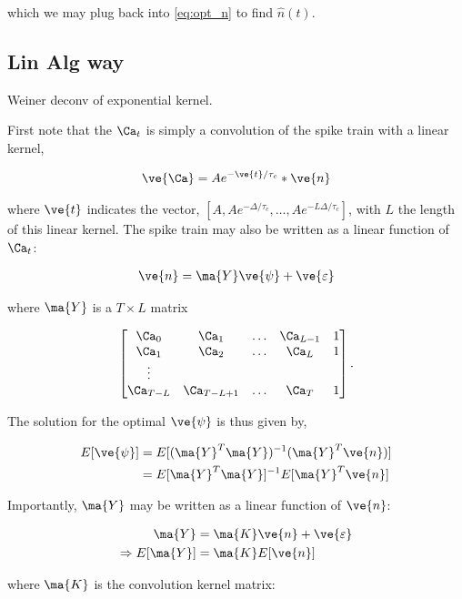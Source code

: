 \noindent which we may plug back into \eqref{eq:opt_n} to find $\widehat{n}(t)$.


\subsection{Lin Alg way}

Weiner deconv of exponential kernel.

First note that the $\Ca_t$ is simply a convolution of the spike train with a linear kernel,

\begin{align}
\ve{\Ca} = Ae^{-\ve{t}/\tau_c} \ast \ve{n}
\end{align}

\noindent where $\ve{t}$ indicates the vector, $[A, Ae^{-\Delta/\tau_c},\ldots, Ae^{-L\Delta/\tau_c}]$, with $L$ the length of this linear kernel.  The spike train may also be written as a linear function of $\Ca_t$:


\begin{align}
\ve{n} = \ma{Y} \ve{\psi} + \ve{\varepsilon}
\end{align}

\noindent where $\ma{Y}$ is a $T \times L$ matrix

\begin{equation}
\begin{bmatrix}
\Ca_0&\Ca_1&\ldots&\Ca_{L-1}&1\\
\Ca_1&\Ca_2&\ldots&\Ca_L&1\\
\vdots\\
\Ca_{T-L}&\Ca_{T-L+1}&\ldots&\Ca_T&1
\end{bmatrix}.
\end{equation}

The solution for the optimal $\ve{\psi}$ is thus given by,

\begin{align}
E[\ve{\psi}] &= E[(\ma{Y}^T\ma{Y})^{-1}(\ma{Y}^T\ve{n})]\\
&=E[\ma{Y}^T\ma{Y}]^{-1}E[\ma{Y}^T\ve{n}]
\end{align}

Importantly, $\ma{Y}$ may be written as a linear function of $\ve{n}$:

\begin{align} \label{eq:YKn}
\ma{Y}&=\ma{K}\ve{n}+\ve{\varepsilon}\\
\Rightarrow E[\ma{Y}] &= \ma{K}E[\ve{n}]
\end{align}

\noindent where $\ma{K}$ is the convolution kernel matrix:

